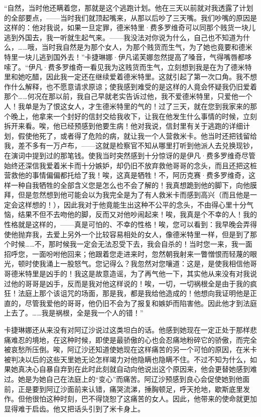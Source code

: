 \par “自然，当时他还瞒着您，那就是这个逃跑计划。他在三天以前就对我透露了计划的全部要点，——当时我们就顶起嘴来，从那以后吵了三天嘴。我们吵嘴的原因是这样的：他对我说，如果一旦定罪，德米特里·费多罗维奇可以同那个贱货一块儿逃到外国去，我一听就生起气来。——我没法对你说为什么，自己也不知道为什么，……哦，当时我自然是为那个女人，为那个贱货而生气，为了她也竟要和德米特里一块儿逃到国外去！”卡捷琳娜·伊凡诺芙娜忽然提高了嗓音，气得嘴唇都哆嗦了。“伊凡·费多罗维奇一看见我为这贱货而生气，立刻想到我是在为了德米特里和她吃醋，因此我一定还在继续爱着德米特里。这就引起了第一次口角。我不想作什么解释，也不愿意请求原谅；使我感到难受的是这样的人竟会怀疑我仍旧爱着那个……何况在那以前，我自己早就老实告诉过他，我不爱德米特里，只爱他一个人！我单是为了恨这女人，才生德米特里的气的！过了三天，就在您到我家来的那个晚上，他拿来一个封好的信封交给我收下，让我在他发生什么事情的时候，立刻拆开来看。唉，他已经预感到他要生病！他对我说，信封里有关于逃跑的详细计划，假使他死了，或者得了危险的病，就让我一个人营救米卡。他当时还把钱留给我，差不多有一万卢布，——这就是检察官不知从哪里打听到他派人去兑换现钞，在演词中提到过的那笔钱。使我当时突然感到十分惊讶的是伊凡·费多罗维奇尽管始终还深信我爱着米卡而十分嫉妒，却仍旧不放弃救他哥哥的念头，而且还把这桩营救他的事情偏偏都托给了我！唉，这真是牺牲！不，阿历克赛·费多罗维奇，这样一种自我牺牲的全部含义您是怎么也不会了解的！我真想跪到他的脚下，向他膜拜，但是忽然想到他可能会以为我完全是为了有人救米卡而感到高兴（而且他是一定会这样想的！），因此我对于他竟能生出这种不公平的念头，不由得心里十分气恼，结果不但不去吻他的脚，反而又对他吵闹起来！唉，我真是个不幸的人！我的性格就是这样的，——真是可怕的、不幸的性格！唉，您可以看到：我早晚会弄得使他抛弃我，去爱上另外一个比较容易相处的女人，像德米特里一样，但是到了那个时候……不，那时候我一定会无法忍受下去，我会自杀的！当时您一来，我一面招呼您，一面吩咐他回来；他跟着您走进来时，忽然朝我射来一瞥憎恨而轻蔑的眼光，顿时使我涌上一股怒气。您记得么？我忽然对您嚷道：这是，是使我相信他哥哥德米特里是凶手的！我这是故意造谣，为了再气他一下，其实他从来没有对我说过他的哥哥是凶手，反而是我对他这样说的！唉，一切，一切祸根全是由于我的疯狂！法庭上那个该诅咒的场面，那是我，都是我给他造成的！他想向我证明他是正直的，尽管我爱他的哥哥，他仍旧不会为了报复和嫉妒而陷害他。因此他才到法庭上去了。……我是祸根，全是我一个人的错！”
\par 卡捷琳娜还从来没有对阿辽沙说过这类坦白的话。他感到她现在一定正处于那样悲痛难忍的境地，在这种时候，即使是最骄傲的心也会忍痛地粉碎它的骄傲，而完全被哀愁所压倒。唉，阿辽沙还知道使她现在这样痛苦的另一个可怕的原因，在米卡被判决以后的这些天里她无论怎样竭力对他隐瞒也隐瞒不住。不过不知为什么，如果她真决心自暴自弃到在此时此刻就自动向他说出这个原因来，他会更替她感到难过。她是为她自己在法庭上的“变心”而痛苦。阿辽沙预感到良心会促使她到他面前，正是要到阿辽沙面前来认错，痛哭流涕，捶胸顿足，呼天抢地，歇斯底里发作。但他很怕这种时刻，巴不得饶恕了这痛苦的女人。因此，他带来的使命就更加显得难于启齿。他又把话头引到了米卡身上。
